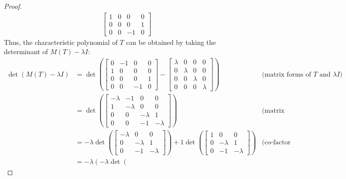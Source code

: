 \documentclass[12pt,reqno]{article}
\theoremstyle{definition}
\begin{document}
\begin{proof}
\begin{align*}
\begin{bmatrix}
            1 & 0 & 0 & 0\\
            0 & 0 & 0 & 1\\
            0 & 0 & -1 & 0
        \end{bmatrix}
    \end{align*}
    Thus, the characteristic polynomial of $T$ can be obtained by taking the determinant of $M(T) - \lambda I$:
    \begin{align*}
        \det(M(T)-\lambda I) &=
        \det\left(
        \begin{bmatrix}
            0 & -1 & 0 & 0\\
            1 & 0 & 0 & 0\\
            0 & 0 & 0 & 1\\
            0 & 0 & -1 & 0
        \end{bmatrix}
        -
        \begin{bmatrix}
            \lambda & 0 & 0 & 0\\
            0 & \lambda & 0 & 0\\
            0 & 0 & \lambda & 0\\
            0 & 0 & 0 & \lambda
        \end{bmatrix}\right)
        & \text{(matrix forms of $T$ and $\lambda I$)}\\
        &= \det\left(
        \begin{bmatrix}
            -\lambda & -1 & 0 & 0\\
            1 & -\lambda & 0 & 0\\
            0 & 0 & -\lambda & 1\\
            0 & 0 & -1 & -\lambda
        \end{bmatrix}\right)
        & \text{(matrix subtraction)}\\
        &= -\lambda\det\left(
        \begin{bmatrix}
            -\lambda & 0 & 0\\
            0 & -\lambda & 1\\
            0 & -1 & -\lambda
        \end{bmatrix}\right)
        + 1\det\left(
        \begin{bmatrix}
            1 & 0 & 0\\
            0 & -\lambda & 1\\
            0 & -1 & -\lambda
        \end{bmatrix}\right)
        & \text{(co-factor expansion)}\\
        &= -\lambda\left(-\lambda\det\left(

\end{align*}
\end{proof}
\end{document}
